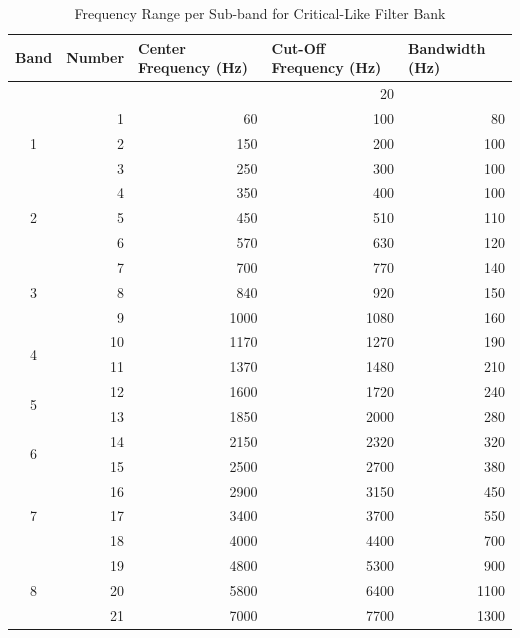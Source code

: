 \documentclass[12pt, onecolumn]{article}
\begin{document}
\begin{appendices}
\begin{table}[htbp]
  \centering
  \caption{Frequency Range per Sub-band for Critical-Like Filter Bank}
  \begin{adjustbox}{width=0.9\linewidth}
    \begin{tabular}{|c|r|r|r|r|}
    \hline
    \multicolumn{1}{|l|}{\textbf{Band}} & \multicolumn{1}{l|}{\textbf{Number}} & \multicolumn{1}{l|}{\textbf{Center Frequency (Hz) }} & \multicolumn{1}{l|}{\textbf{Cut-Off Frequency (Hz)}} & \multicolumn{1}{l|}{\textbf{Bandwidth (Hz)}} \\
    \hline
          &       &       & 20    &  \\
    \hline
    \multirow{3}[6]{*}{1} & 1     & 60    & 100   & 80 \\
\cline{2-5}          & 2     & 150   & 200   & 100 \\
\cline{2-5}          & 3     & 250   & 300   & 100 \\
    \hline
    \multirow{3}[6]{*}{2} & 4     & 350   & 400   & 100 \\
\cline{2-5}          & 5     & 450   & 510   & 110 \\
\cline{2-5}          & 6     & 570   & 630   & 120 \\
    \hline
    \multirow{3}[6]{*}{3} & 7     & 700   & 770   & 140 \\
\cline{2-5}          & 8     & 840   & 920   & 150 \\
\cline{2-5}          & 9     & 1000  & 1080  & 160 \\
    \hline
    \multirow{2}[4]{*}{4} & 10    & 1170  & 1270  & 190 \\
\cline{2-5}          & 11    & 1370  & 1480  & 210 \\
    \hline
    \multirow{2}[4]{*}{5} & 12    & 1600  & 1720  & 240 \\
\cline{2-5}          & 13    & 1850  & 2000  & 280 \\
    \hline
    \multirow{2}[4]{*}{6} & 14    & 2150  & 2320  & 320 \\
\cline{2-5}          & 15    & 2500  & 2700  & 380 \\
    \hline
    \multirow{3}[6]{*}{7} & 16    & 2900  & 3150  & 450 \\
\cline{2-5}          & 17    & 3400  & 3700  & 550 \\
\cline{2-5}          & 18    & 4000  & 4400  & 700 \\
    \hline
    \multirow{3}[6]{*}{8} & 19    & 4800  & 5300  & 900 \\
\cline{2-5}          & 20    & 5800  & 6400  & 1100 \\
\cline{2-5}          & 21    & 7000  & 7700  & 1300 \\
    \hline
    \end{tabular}%
    \end{adjustbox}
  \label{tab:critFiltFreqBand}%
\end{table}%


\end{appendices}
\end{document}
